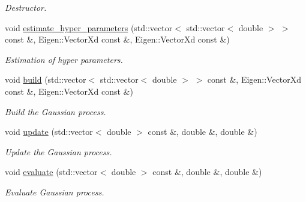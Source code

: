\begin{DoxyCompactItemize}
\begin{DoxyCompactList}\small\item\em Destructor. \end{DoxyCompactList}\item 
void \hyperlink{class_gaussian_process_a4ecd712c66dfbcb080f4bd6ef944afbd}{estimate\+\_\+hyper\+\_\+parameters} (std\+::vector$<$ std\+::vector$<$ double $>$ $>$ const \&, Eigen\+::\+Vector\+Xd const \&, Eigen\+::\+Vector\+Xd const \&)
\begin{DoxyCompactList}\small\item\em Estimation of hyper parameters. \end{DoxyCompactList}\item 
void \hyperlink{class_gaussian_process_ac20f85e4b9380e358937f2f079269132}{build} (std\+::vector$<$ std\+::vector$<$ double $>$ $>$ const \&, Eigen\+::\+Vector\+Xd const \&, Eigen\+::\+Vector\+Xd const \&)
\begin{DoxyCompactList}\small\item\em Build the Gaussian process. \end{DoxyCompactList}\item 
void \hyperlink{class_gaussian_process_ab5566efc19d076df9002ed2068f0a7c5}{update} (std\+::vector$<$ double $>$ const \&, double \&, double \&)
\begin{DoxyCompactList}\small\item\em Update the Gaussian process. \end{DoxyCompactList}\item 
void \hyperlink{class_gaussian_process_ae424ee009f6f36ac195359a8b38609fb}{evaluate} (std\+::vector$<$ double $>$ const \&, double \&, double \&)
\begin{DoxyCompactList}\small\item\em Evaluate Gaussian process. \end{DoxyCompactList}\end{DoxyCompactItemize}

